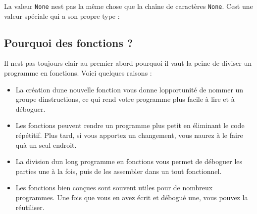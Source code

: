 \begin{Shaded}
\begin{Highlighting}[]
\OperatorTok{\textgreater{}\textgreater{}\textgreater{}}\OperatorTok{=}\NormalTok{)}
\OperatorTok{\textgreater{}\textgreater{}\textgreater{}} 
\end{Highlighting}
\end{Shaded}

La valeur \texttt{None} n\textquotesingle est pas la même chose que la
chaîne de caractères \texttt{\textquotesingle{}None\textquotesingle{}}.
C\textquotesingle est une valeur spéciale qui a son propre type :

\begin{Shaded}
\begin{Highlighting}[]
\OperatorTok{\textgreater{}\textgreater{}\textgreater{}} \NormalTok{(}\NormalTok{)}
\OperatorTok{\textless{}} \OperatorTok{\textgreater{}}
\end{Highlighting}
\end{Shaded}

\hypertarget{pourquoi-des-fonctions}{%
\subsection{Pourquoi des fonctions ?}\label{pourquoi-des-fonctions}}

Il n\textquotesingle est pas toujours clair au premier abord pourquoi il
vaut la peine de diviser un programme en fonctions. Voici quelques
raisons :

\begin{itemize}
\tightlist
\item
  La création d\textquotesingle une nouvelle fonction vous donne
  l\textquotesingle opportunité de nommer un groupe
  d\textquotesingle instructions, ce qui rend votre programme plus
  facile à lire et à déboguer.
\item
  Les fonctions peuvent rendre un programme plus petit en éliminant le
  code répétitif. Plus tard, si vous apportez un changement, vous
  n\textquotesingle aurez à le faire qu\textquotesingle à un seul
  endroit.
\item
  La division d\textquotesingle un long programme en fonctions vous
  permet de déboguer les parties une à la fois, puis de les assembler
  dans un tout fonctionnel.
\item
  Les fonctions bien conçues sont souvent utiles pour de nombreux
  programmes. Une fois que vous en avez écrit et débogué une, vous
  pouvez la réutiliser.
\end{itemize}

